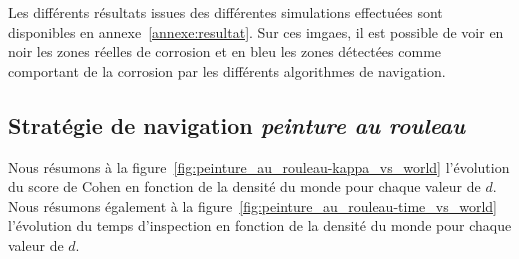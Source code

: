 \documentclass[francais,RandD]{rapportPFE}
\begin{document}

		Les différents résultats issues des différentes simulations effectuées sont disponibles en annexe~\ref{annexe:resultat}.
		Sur ces imgaes, il est possible de voir en noir les zones réelles de corrosion et en bleu les zones détectées comme comportant de la corrosion par les différents algorithmes de navigation.
		\subsection*{Stratégie de navigation \textit{peinture au rouleau}}
			Nous résumons à la figure~\ref{fig:peinture_au_rouleau-kappa_vs_world} l'évolution du score de Cohen en fonction de la densité du monde pour chaque valeur de $d$.
			Nous résumons également à la figure~\ref{fig:peinture_au_rouleau-time_vs_world} l'évolution du temps d'inspection en fonction de la densité du monde pour chaque valeur de $d$.
\end{document}
